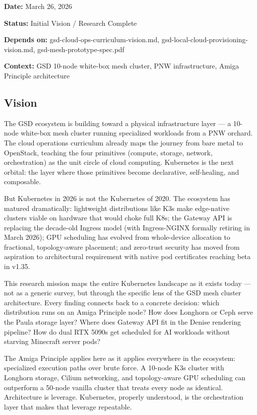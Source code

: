 \documentclass[11pt,letterpaper]{article}
\newcommand{\metafield}[2]{\textbf{\sffamily #1} #2\par}
\begin{document}
\metafield{Date:}{March 26, 2026}
\metafield{Status:}{Initial Vision / Research Complete}
\metafield{Depends on:}{gsd-cloud-ops-curriculum-vision.md, gsd-local-cloud-provisioning-vision.md, gsd-mesh-prototype-spec.pdf}
\metafield{Context:}{GSD 10-node white-box mesh cluster, PNW infrastructure, Amiga Principle architecture}

\subsection{Vision}

The GSD ecosystem is building toward a physical infrastructure layer --- a 10-node white-box mesh cluster running specialized workloads from a PNW orchard. The cloud operations curriculum already maps the journey from bare metal to OpenStack, teaching the four primitives (compute, storage, network, orchestration) as the unit circle of cloud computing. Kubernetes is the next orbital: the layer where those primitives become declarative, self-healing, and composable.

But Kubernetes in 2026 is not the Kubernetes of 2020. The ecosystem has matured dramatically: lightweight distributions like K3s make edge-native clusters viable on hardware that would choke full K8s; the Gateway API is replacing the decade-old Ingress model (with Ingress-NGINX formally retiring in March 2026); GPU scheduling has evolved from whole-device allocation to fractional, topology-aware placement; and zero-trust security has moved from aspiration to architectural requirement with native pod certificates reaching beta in v1.35.

This research mission maps the entire Kubernetes landscape as it exists today --- not as a generic survey, but through the specific lens of the GSD mesh cluster architecture. Every finding connects back to a concrete decision: which distribution runs on an Amiga Principle node? How does Longhorn or Ceph serve the Paula storage layer? Where does Gateway API fit in the Denise rendering pipeline? How do dual RTX 5090s get scheduled for AI workloads without starving Minecraft server pods?

The Amiga Principle applies here as it applies everywhere in the ecosystem: specialized execution paths over brute force. A 10-node K3s cluster with Longhorn storage, Cilium networking, and topology-aware GPU scheduling can outperform a 50-node vanilla cluster that treats every node as identical. Architecture is leverage. Kubernetes, properly understood, is the orchestration layer that makes that leverage repeatable.
\end{document}
